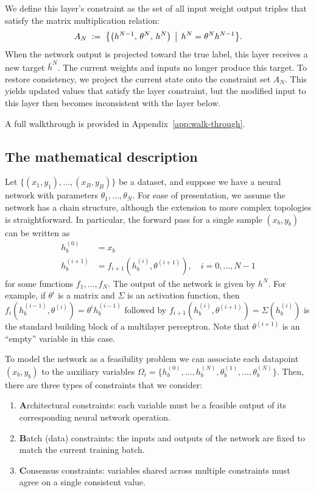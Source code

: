 \documentclass{article}
\theoremstyle{plain}
\theoremstyle{definition}
\theoremstyle{remark}
\begin{document}
We define this layer's constraint as the set of all input weight output triples that satisfy the matrix multiplication relation:
$$A_{N} \;:=\; \bigl\{\bigl(h^{N-1},\, \theta^{N},\, h^{N}\bigr)
\,\bigm|\, h^{N} = \theta^{N} h^{N-1} \bigr\}.$$
When the network output is projected toward the true label, this layer receives a new target $\bar{h}^{N}$. The current weights and inputs no longer produce this target. To restore consistency, we project the current state onto the constraint set $A_{N}$. This yields updated values that satisfy the layer constraint, but the modified input to this layer then becomes inconsistent with the layer below.

A full walkthrough is provided in Appendix~\ref{app:walk-through}.


\subsection{The mathematical description}
Let $\{(x_1, y_1), \ldots, (x_B, y_B)\}$ be a dataset, and suppose we have a neural network with parameters $\theta_1, \ldots, \theta_N$. For ease of presentation, we assume the network has a chain structure, although the extension to more complex topologies is straightforward. In particular, the forward pass for a single sample $(x_b, y_b)$ can be written as
\begin{align*}
    h^{(0)}_b &= x_b \\
    h^{(i+1)}_b &= f_{i+1}(h^{(i)}_b, \theta^{(i+1)}), \quad i=0,\ldots,N-1
\end{align*}
for some functions $f_1, \ldots, f_N$. The output of the network is given by $h^N$. For example, if $\theta^i$ is a matrix and $\Sigma$ is an activation function,  then $f_i(h^{(i-1)}_b, \theta^{(i)}) = \theta^i h^{(i-1)}_b$ followed by $f_{i+1}(h^{(i)}_b, \theta^{(i+1)}) = \Sigma(h^{(i)}_b)$ is the standard building block of a multilayer perceptron. Note that $\theta^{(i+1)}$ is an ``empty'' variable in this case.

To model the network as a feasibility problem we can associate  each datapoint $(x_b, y_b)$ to the auxiliary variables $\Omega_i=\{h^{(0)}_b, \ldots, h^{(N)}_b, \theta^{(1)}_b, \ldots, \theta_b^{(N)}\}$. Then, there are three types of constraints that we consider:
\begin{enumerate}
    \item \textbf{A}rchitectural constraints: each variable must be a feasible output of its corresponding neural network operation.
    \item \textbf{B}atch (data) constraints: the inputs and outputs of the network are fixed to match the current training batch.
    \item \textbf{C}onsensus constraints: variables shared across multiple constraints must agree on a single consistent value.
\end{enumerate}
\end{document}
